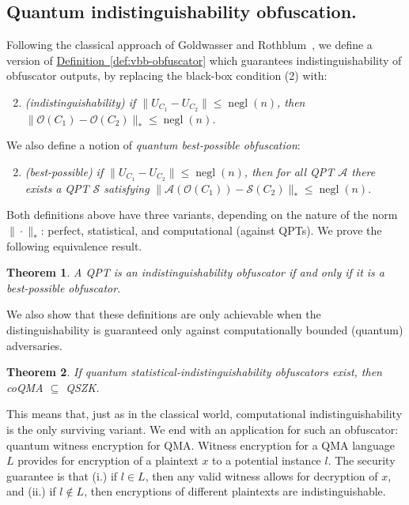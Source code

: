 \documentclass[11pt]{amsart}
\numberwithin{equation}{section}
\newtheorem{theorem}{Theorem}
\newcommand{\opn}{\operatorname}
\newcommand{\expref}[2]{\texorpdfstring{\hyperref[#2]{#1~\ref{#2}}}{#1~\ref{#2}}}
\newcommand{\negl}{\opn{negl}}
\begin{document}
\subsection{Quantum indistinguishability obfuscation.}

Following the classical approach of Goldwasser and Rothblum~\cite{GR07}, we define a version of \expref{Definition}{def:vbb-obfuscator} which guarantees indistinguishability of obfuscator outputs, by replacing the black-box condition (2) with:
\begin{enumerate}
\setcounter{enumi}{1}
\item \emph{(indistinguishability) if $\|U_{C_1} - U_{C_2}\| \leq \negl(n)$, then $\|\mathcal O(C_1) - \mathcal O(C_2)\|_{*} \leq \negl(n)$.}
\end{enumerate}
We also define a notion of \emph{quantum best-possible obfuscation}:
\begin{enumerate}
\setcounter{enumi}{1}
\item \emph{(best-possible) if $\|U_{C_1} - U_{C_2}\| \leq \negl(n)$, then for all QPT $\mathcal A$ there exists a QPT $\mathcal S$ satisfying}
$\| \mathcal A(\mathcal O(C_1)) - \mathcal S(C_2) \|_{*} \leq \negl(n)$.
\end{enumerate}
\noindent Both definitions above have three variants, depending on the nature of the norm $\| \cdot \|_{*}$: perfect, statistical, and computational (against QPTs). We prove the following equivalence result.

\begin{theorem}
A QPT is an indistinguishability obfuscator if and only if it is a best-possible obfuscator.
\end{theorem}

\noindent We also show that these definitions are only achievable when the distinguishability is guaranteed only against computationally bounded (quantum) adversaries.

\begin{theorem}
If quantum statistical-indistinguishability obfuscators exist, then coQMA $\subseteq$ QSZK.
\end{theorem}

This means that, just as in the classical world, computational indistinguishability is the only surviving variant. We end with an application for such an obfuscator: quantum witness encryption for QMA. Witness encryption for a QMA language $L$ provides for encryption of a plaintext $x$ to a potential instance $l$. The security guarantee is that (i.) if $l \in L$, then any valid witness allows for decryption of $x$, and (ii.) if $l \notin L$, then encryptions of different plaintexts are indistinguishable. 
\end{document}
